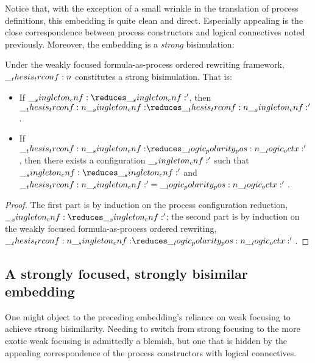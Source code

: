 Notice that, with the exception of a small wrinkle in the translation of process definitions, this embedding is quite clean and direct.
Especially appealing is the close correspondence between process constructors and logical connectives noted previously.
%
Moreover, the embedding is a \emph{strong} bisimulation:
%
\begin{theorem}
  Under the weakly focused formula-as-process ordered rewriting framework, $\__thesis_trconf:n {}$ constitutes a strong bisimulation.
  That is:
  \begin{itemize}[nosep]
  \item If\/ $\cnf \reduces \cnf'$, then $\trconf{\cnf} \reduces \trconf{\cnf'}$.
  \item If\/ $\trconf{\cnf} \reduces \p{\octx'{}}$, then there exists a configuration $\__singleton_cnf:'$ such that $\cnf \reduces \cnf'$ and $\__thesis_trconf:n {\__singleton_cnf:'} = \__logic_polarity_pos:n {\__logic_octx:'{}}$.
  \end{itemize}
\end{theorem}
\begin{proof}
  The first part is by induction on the process configuration reduction, $\cnf \reduces \cnf'$; the second part is by induction on the weakly focused formula-as-process ordered rewriting, $\trconf{\cnf} \reduces \p{\octx'{}}$.
\end{proof}

\subsection{A strongly focused, strongly bisimilar embedding}\label{sec:embed:strong-focused-strong-bisim}

One might object to the preceding embedding's reliance on weak focusing to achieve strong bisimilarity.
Needing to switch from strong focusing to the more exotic weak focusing is admittedly a blemish, but one that is hidden by the appealing correspondence of the process constructors with logical connectives. 

